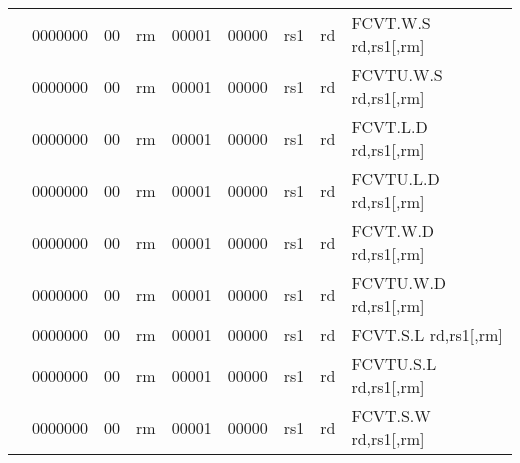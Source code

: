 \begin{table}[p]
\begin{small}
\begin{center}
\begin{tabular}{rcccccccccl}
&
\multicolumn{1}{|c|}{0000000} &
\multicolumn{1}{c|}{00} &
\multicolumn{2}{c|}{rm} &
\multicolumn{2}{c|}{00001} &
\multicolumn{1}{c|}{00000} &
\multicolumn{1}{c|}{rs1} &
\multicolumn{1}{c|}{rd} & FCVT.W.S rd,rs1[,rm] \\
\cline{2-10}
  

&
\multicolumn{1}{|c|}{0000000} &
\multicolumn{1}{c|}{00} &
\multicolumn{2}{c|}{rm} &
\multicolumn{2}{c|}{00001} &
\multicolumn{1}{c|}{00000} &
\multicolumn{1}{c|}{rs1} &
\multicolumn{1}{c|}{rd} & FCVTU.W.S rd,rs1[,rm] \\
\cline{2-10}
  

&
\multicolumn{1}{|c|}{0000000} &
\multicolumn{1}{c|}{00} &
\multicolumn{2}{c|}{rm} &
\multicolumn{2}{c|}{00001} &
\multicolumn{1}{c|}{00000} &
\multicolumn{1}{c|}{rs1} &
\multicolumn{1}{c|}{rd} & FCVT.L.D rd,rs1[,rm] \\
\cline{2-10}
  

&
\multicolumn{1}{|c|}{0000000} &
\multicolumn{1}{c|}{00} &
\multicolumn{2}{c|}{rm} &
\multicolumn{2}{c|}{00001} &
\multicolumn{1}{c|}{00000} &
\multicolumn{1}{c|}{rs1} &
\multicolumn{1}{c|}{rd} & FCVTU.L.D rd,rs1[,rm] \\
\cline{2-10}
  

&
\multicolumn{1}{|c|}{0000000} &
\multicolumn{1}{c|}{00} &
\multicolumn{2}{c|}{rm} &
\multicolumn{2}{c|}{00001} &
\multicolumn{1}{c|}{00000} &
\multicolumn{1}{c|}{rs1} &
\multicolumn{1}{c|}{rd} & FCVT.W.D rd,rs1[,rm] \\
\cline{2-10}
  

&
\multicolumn{1}{|c|}{0000000} &
\multicolumn{1}{c|}{00} &
\multicolumn{2}{c|}{rm} &
\multicolumn{2}{c|}{00001} &
\multicolumn{1}{c|}{00000} &
\multicolumn{1}{c|}{rs1} &
\multicolumn{1}{c|}{rd} & FCVTU.W.D rd,rs1[,rm] \\
\cline{2-10}
  

&
\multicolumn{1}{|c|}{0000000} &
\multicolumn{1}{c|}{00} &
\multicolumn{2}{c|}{rm} &
\multicolumn{2}{c|}{00001} &
\multicolumn{1}{c|}{00000} &
\multicolumn{1}{c|}{rs1} &
\multicolumn{1}{c|}{rd} & FCVT.S.L rd,rs1[,rm] \\
\cline{2-10}
  

&
\multicolumn{1}{|c|}{0000000} &
\multicolumn{1}{c|}{00} &
\multicolumn{2}{c|}{rm} &
\multicolumn{2}{c|}{00001} &
\multicolumn{1}{c|}{00000} &
\multicolumn{1}{c|}{rs1} &
\multicolumn{1}{c|}{rd} & FCVTU.S.L rd,rs1[,rm] \\
\cline{2-10}
  

&
\multicolumn{1}{|c|}{0000000} &
\multicolumn{1}{c|}{00} &
\multicolumn{2}{c|}{rm} &
\multicolumn{2}{c|}{00001} &
\multicolumn{1}{c|}{00000} &
\multicolumn{1}{c|}{rs1} &
\multicolumn{1}{c|}{rd} & FCVT.S.W rd,rs1[,rm] \\
\cline{2-10}
  


\end{tabular}
\end{center}
\end{small}
\end{table}

